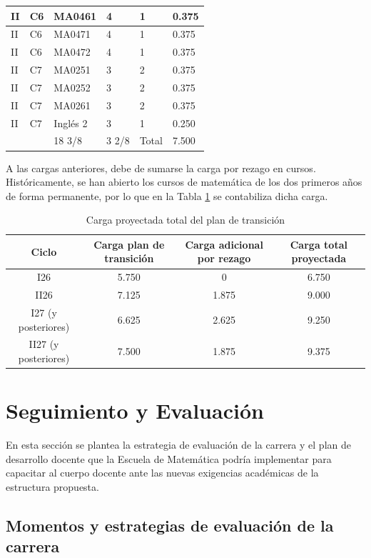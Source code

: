 \begin{longtable}[c]{|l|l|l|l|l|l|}
II & C6 & MA0461 & 4 & 1 & 0.375 \\ \hline
II & C6 & MA0471 & 4 & 1 & 0.375 \\ \hline
II & C6 & MA0472 & 4 & 1 & 0.375 \\ \hline
II & C7 & MA0251 & 3 & 2 & 0.375 \\ \hline
II & C7 & MA0252 & 3 & 2 & 0.375 \\ \hline
II & C7 & MA0261 & 3 & 2 & 0.375 \\ \hline
II & C7 & Inglés 2 & 3 & 1 & 0.250 \\ \hline
 &  & 18 3/8 & 3 2/8 & Total & 7.500 \\ \hline
\end{longtable}

A las cargas anteriores, debe de sumarse la carga por rezago en cursos. Históricamente, se han abierto los cursos de matemática de los dos primeros años de forma permanente, por lo que en la Tabla \ref{tab:resumenCarga} se contabiliza dicha carga.
\begin{longtable}[c]{|c|c|c|c|}
\caption{Carga proyectada total del plan de transición}
\label{tab:resumenCarga}\\
\hline
\rowcolor[HTML]{00C0F3}
Ciclo & Carga plan de transición & Carga adicional por rezago & Carga total proyectada \\ \hline
\endhead
%
I26 & 5.750 & 0 & 6.750 \\ \hline
II26 & 7.125 & 1.875 & 9.000 \\ \hline
I27 (y posteriores) & 6.625 & 2.625 & 9.250 \\ \hline
II27 (y posteriores) & 7.500 & 1.875 & 9.375 \\ \hline
\end{longtable}

\section{Seguimiento y Evaluación}

En esta sección se plantea la estrategia de evaluación de la carrera y el plan de desarrollo docente que la Escuela de Matemática podría implementar para capacitar al cuerpo docente ante las nuevas exigencias académicas de la estructura propuesta.

\subsection{Momentos y estrategias de evaluación de la carrera}

